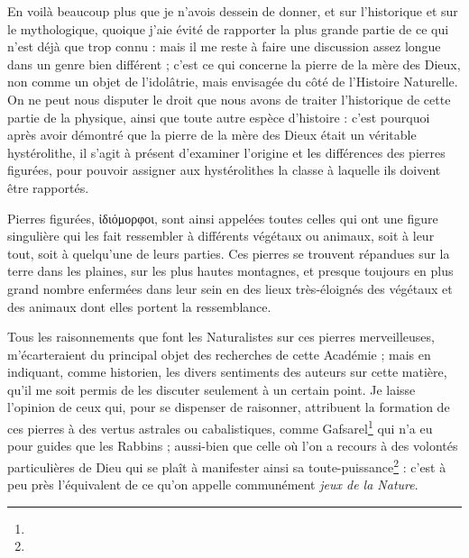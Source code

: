 \documentclass[a4paper, 11pt, oneside, polutonikogreek, french]{article}
\begin{document}
En voilà beaucoup plus que je n'avois dessein de donner, et sur l'historique et sur le mythologique, quoique j'aie évité de rapporter la plus grande partie de ce qui n'est déjà que trop connu : mais il me reste à faire une discussion assez longue dans un genre bien différent ; c'est ce qui concerne la pierre de la mère des Dieux, non comme un objet de l'idolâtrie, mais envisagée du côté de l'Histoire Naturelle. On ne peut nous disputer le droit que nous avons de traiter l'historique de cette partie de la physique, ainsi que toute autre espèce d'histoire : c'est pourquoi après avoir démontré que la pierre de la mère des Dieux était un véritable hystérolithe, il s'agit à présent d'examiner l'origine et les différences des pierres figurées, pour pouvoir assigner aux hystérolithes la classe à laquelle ils doivent être rapportés.

Pierres figurées, ἰδιόμορφοι, sont ainsi appelées toutes celles qui ont une figure singulière qui les fait ressembler à différents végétaux ou animaux, soit à leur tout, soit à quelqu'une de leurs parties. Ces pierres se trouvent répandues sur la terre dans les plaines, sur les plus hautes montagnes, et presque toujours en plus grand nombre enfermées dans leur sein en des lieux très-éloignés des végétaux et des animaux dont elles portent la ressemblance.

Tous les raisonnements que font les Naturalistes sur ces pierres merveilleuses, m'écarteraient du principal objet des recherches de cette Académie ; mais en indiquant, comme historien, les divers sentiments des auteurs sur cette matière, qu'il me soit permis de les discuter seulement à un certain point. Je laisse l'opinion de ceux qui, pour se dispenser de raisonner, attribuent la formation de ces pierres à des vertus astrales ou cabalistiques, comme Gafsarel\footnote{} qui n'a eu pour guides que les Rabbins ; aussi-bien que celle où l'on a recours à des volontés particulières de Dieu qui se plaît à manifester ainsi sa toute-puissance\footnote{} : c'est à peu près l'équivalent de ce qu'on appelle communément \emph{jeux de la Nature}.
\end{document}
